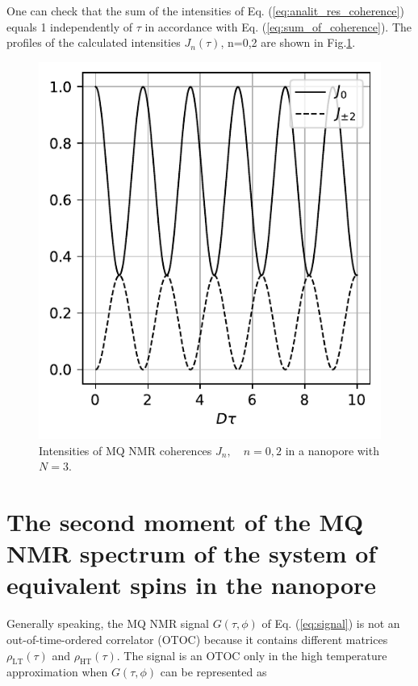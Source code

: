 \documentclass[%
 reprint,
superscriptaddress,
 amsmath,amssymb,
]{revtex4-2}
\begin{document}
One can check that the sum of the intensities of Eq.   (\ref{eq:analit_res_coherence}) equals 1 independently of $\tau$ in accordance with Eq.   (\ref{eq:sum_of_coherence}). The profiles of the calculated intensities $J_n(\tau)$, n=0,2 are shown in Fig.\ref{fig:exact_j}.
\begin{figure}
    \centering
    \includegraphics{exact_j.pdf}
    \caption{Intensities of MQ NMR coherences $J_n, \quad n=0, 2$ in a nanopore with $N = 3$.}
    \label{fig:exact_j}
\end{figure}


\section{The second moment of the MQ NMR spectrum of the system of equivalent spins in the nanopore}
\label{sec:second_moment}

Generally speaking, the MQ NMR signal $G(\tau, \phi)$ of Eq. (\ref{eq:signal}) is not an out-of-time-ordered correlator (OTOC) \cite{otoc_to_enanglement_via_mqcoh} because it contains different matrices $\rho_\mathrm{LT}(\tau)$ and $\rho_\mathrm{HT}(\tau)$. The signal is an OTOC only in the high temperature approximation when $G(\tau, \phi)$ can be represented as
\end{document}
